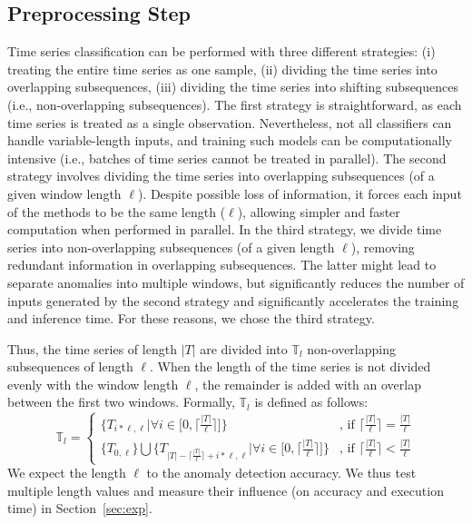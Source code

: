\subsection{Preprocessing Step}
Time series classification can be performed with three different strategies: (i) treating the entire time series as one sample, (ii) dividing the time series into overlapping subsequences, (iii) dividing the time series into shifting subsequences (i.e., non-overlapping subsequences). The first strategy is straightforward, as each time series is treated as a single observation. Nevertheless, not all classifiers can handle variable-length inputs, and training such models can be computationally intensive (i.e., batches of time series cannot be treated in parallel). The second strategy involves dividing the time series into overlapping subsequences (of a given window length $\ell$). Despite possible loss of information, it forces each input of the methods to be the same length ($\ell$), allowing simpler and faster computation when performed in parallel. In the third strategy, we divide time series into non-overlapping subsequences (of a given length $\ell$), removing redundant information in overlapping subsequences. The latter might lead to separate anomalies into multiple windows, but significantly reduces the number of inputs generated by the second strategy and significantly accelerates the training and inference time. For these reasons, we chose the third strategy.

Thus, the time series of length $|T|$ are divided into $\mathbb{T}_l$ non-overlapping subsequences of length $\ell$. When the length of the time series is not divided evenly with the window length $\ell$, the remainder is added with an overlap between the first two windows. Formally, $\mathbb{T}_l$ is defined as follows:
\begin{equation*}
    \mathbb{T}_l = \left.
    \begin{cases}
        \big\{T_{i*\ell,\ell} \big| \forall i \in \big[0,\big\lceil \frac{|T|}{\ell} \big\rceil \big] \big\} &\text{, if } \big\lceil \frac{|T|}{\ell} \big\rceil = \frac{|T|}{\ell} \\
        \big\{ T_{0,\ell} \big\} \bigcup \big\{T_{|T| - \lceil \frac{|T|}{\ell} \rceil+i*\ell,\ell} \big| \forall i \in \big[0,\big\lceil \frac{|T|}{\ell} \big\rceil\big] \big\} &\text{, if } \big\lceil \frac{|T|}{\ell} \big\rceil < \frac{|T|}{\ell}
    \end{cases}
    \right. 
\end{equation*}
We expect the length $\ell$ to  the anomaly detection accuracy. We thus test multiple length values and measure their influence (on accuracy and execution time) in Section~\ref{sec:exp}.

